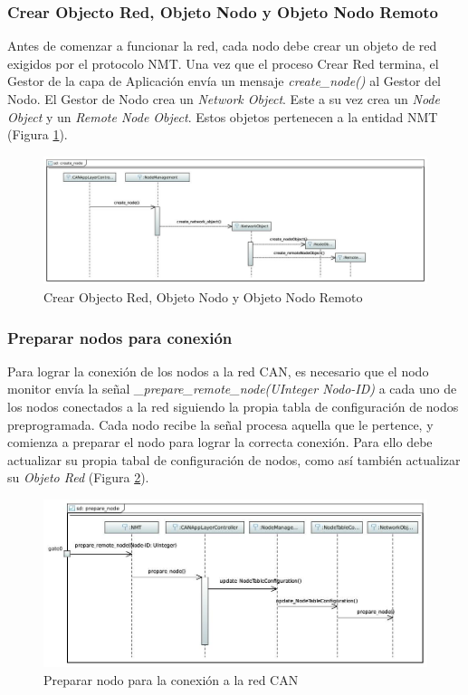 \subsubsection{Crear Objecto Red, Objeto Nodo y Objeto Nodo Remoto}
Antes de comenzar a funcionar la red, cada nodo debe crear un objeto de red
exigidos por el protocolo NMT. Una vez que el proceso Crear Red termina,
el Gestor de la capa de Aplicación envía un mensaje \textit{create\_node()}
al Gestor del Nodo. El Gestor de Nodo crea un \textit{Network Object}. Este a su
vez crea un \textit{Node Object} y un \textit{Remote Node Object}. Estos objetos
pertenecen a la entidad NMT (Figura \ref{fig:CreateNode}).

\begin{figure}[h!]
 \centering
 \includegraphics[scale=0.4]{images/Secciones/AppendixA/create_node.JPG}
  \caption{Crear Objecto Red, Objeto Nodo y Objeto Nodo Remoto}
  \label{fig:CreateNode}
\end{figure}

\subsubsection{Preparar nodos para conexión}
Para lograr la conexión de los nodos a la red CAN, es necesario que el nodo
monitor envía la señal \textit{\_prepare\_remote\_node(UInteger Nodo-ID)} a
cada uno de los nodos conectados a la red siguiendo la propia tabla de
configuración de nodos preprogramada. Cada nodo recibe la señal procesa aquella
que le pertence, y comienza a preparar el nodo para lograr la correcta conexión.
Para ello debe actualizar su propia tabal de configuración de nodos, como así
también actualizar su \textit{Objeto Red} (Figura \ref{fig:PrepareNode}).

\begin{figure}[h!]
 \centering
 \includegraphics[scale=0.4]{images/Secciones/AppendixA/PrepareNode.JPG}
  \caption{Preparar nodo para la conexión a la red CAN}
  \label{fig:PrepareNode}
\end{figure}

